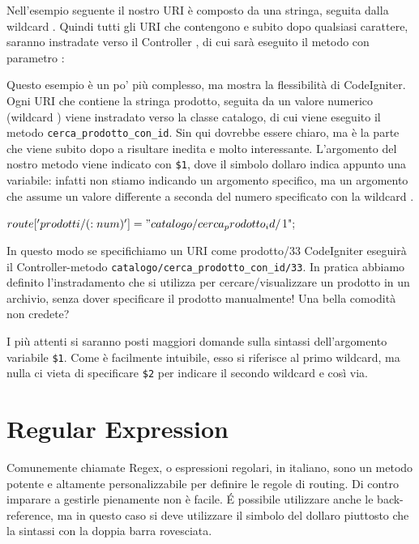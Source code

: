 Nell'esempio seguente il nostro \ac{URI} è composto da una stringa, seguita dalla wildcard . Quindi tutti gli \ac{URI} che contengono  e subito dopo qualsiasi carattere, saranno instradate verso il Controller , di cui sarà eseguito il metodo  con parametro :


Questo esempio è un po' più complesso, ma mostra la flessibilità di CodeIgniter. Ogni \ac{URI} che contiene la stringa prodotto, seguita da un valore numerico (wildcard ) viene instradato verso la classe catalogo, di cui viene eseguito il metodo \verb|cerca_prodotto_con_id|. Sin qui dovrebbe essere chiaro, ma è la parte che viene subito dopo a risultare inedita e molto interessante. L'argomento del nostro metodo viene indicato con \verb|$1|, dove il simbolo dollaro indica appunto una variabile: infatti non stiamo indicando un argomento specifico, ma un argomento che assume un valore differente a seconda del numero specificato con la wildcard . 

\begin{code}
$route['prodotti/(:num)'] = "catalogo/cerca_prodotto_id/$1";
\end{code}

In questo modo se specifichiamo un \ac{URI} come prodotto/33 CodeIgniter eseguirà il Controller-metodo \verb|catalogo/cerca_prodotto_con_id/33|. In pratica abbiamo definito l'instradamento che si utilizza per cercare/visualizzare un prodotto in un archivio, senza dover specificare il prodotto manualmente! Una bella comodità non credete? 

I più attenti si saranno posti maggiori domande sulla sintassi dell'argomento variabile \verb|$1|. Come è facilmente intuibile, esso si riferisce al primo wildcard, ma nulla ci vieta di specificare \verb|$2| per indicare il secondo wildcard e così via.

\section{Regular Expression}
Comunemente chiamate Regex, o espressioni regolari, in italiano, sono un metodo potente e altamente personalizzabile per definire le regole di routing. Di contro imparare a gestirle pienamente non è facile. \'E possibile utilizzare anche le back-reference, ma in questo caso si deve utilizzare il simbolo del dollaro piuttosto che la sintassi con la doppia barra rovesciata.

